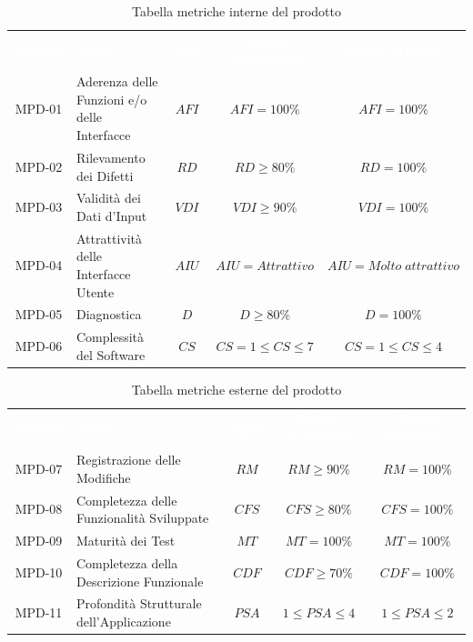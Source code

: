     \renewcommand{\arraystretch}{1.5}
    \begin{longtable}{ c C{4cm} c c c}
    \caption{Tabella metriche interne del prodotto}\\
    \textcolor{white}{\textbf{Metrica}} & \textcolor{white}{\textbf{Nome}} & \textcolor{white}{\textbf{Sigla}} & \textcolor{white}{\textbf{Valore Accettabile}} & \textcolor{white}{\textbf{Valore Ottimale}}\\
    MPD-01 & Aderenza delle Funzioni e/o delle Interfacce & $AFI$ & $AFI = 100\%$ & $AFI = 100\%$ \\
    MPD-02 & Rilevamento dei Difetti & $RD$ & $ RD \geq 80\% $ & $RD = 100\%$ \\
    MPD-03 & Validità dei Dati d'Input & $VDI$ &  $VDI \geq 90\%$ &  $VDI = 100\%$ \\
    MPD-04 & Attrattività delle Interfacce Utente & $AIU$ & $AIU = Attrattivo$ &  $AIU = Molto \; attrattivo$ \\
    MPD-05 & Diagnostica & $D$ & $D \geq 80\% $ & $D = 100\% $ \\
    MPD-06 & Complessità del Software & $CS $ & $CS = 1 \leq CS \leq 7 $ & $CS = 1 \leq CS \leq 4$ \\
    \end{longtable} 

\newpage %

    \renewcommand{\arraystretch}{1.5}
    \begin{longtable}{ c C{4cm} c c c}
    \caption{Tabella metriche esterne del prodotto}\\
    \textcolor{white}{\textbf{Metrica}} & \textcolor{white}{\textbf{Nome}} & \textcolor{white}{\textbf{Sigla}} & \textcolor{white}{\textbf{Valore Accettabile}} & \textcolor{white}{\textbf{Valore Ottimale}}\\
    MPD-07 & Registrazione delle Modifiche & $RM$ & $RM \geq 90\%$ & $RM = 100\%$ \\
    MPD-08 & Completezza delle Funzionalità Sviluppate & $CFS$ & $CFS \geq 80\%$ & $CFS = 100\%$  \\
    MPD-09 & Maturità dei Test & $MT$ & $MT=100\% $ & $MT=100\%$  \\	
    MPD-10 & Completezza della Descrizione Funzionale & $CDF $ & $CDF \geq 70\%$ & $CDF = 100\%$  \\
    MPD-11 &  Profondità Strutturale dell'Applicazione & $PSA$ & $1 \leq PSA \leq 4$ &$1 \leq PSA \leq 2$  \\
    \end{longtable}  
                
       
                 
       
       
